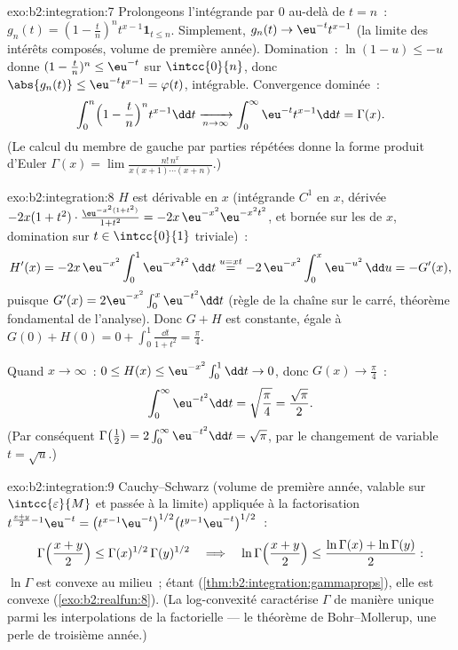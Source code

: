 \begin{solution}{exo:b2:integration:7}
Prolongeons l'intégrande par $0$ au-delà de $t = n$~: $g_n(t) = (1 -
\frac tn)^n t^{x-1}\mathbf{1}_{t \leq n}$. Simplement, $g_n(t) \to
\eu^{-t}t^{x-1}$ (la limite des intérêts composés, volume de première année).
Domination~: $\ln(1 - u) \leq -u$ donne $(1 - \frac tn)^n \leq
\eu^{-t}$ sur $\intcc{0}{n}$, donc $\abs{g_n(t)} \leq
\eu^{-t}t^{x-1} = \varphi(t)$, intégrable. Convergence dominée~:
\[
\int_0^n \Bigl(1 - \frac tn\Bigr)^n t^{x-1}\dd t
\xrightarrow[n\to\infty]{} \int_0^\infty \eu^{-t}t^{x-1}\dd t
= \Gamma(x) .
\]
(Le calcul du membre de gauche par parties répétées donne la forme
produit d'Euler $\Gamma(x) = \lim \frac{n!\,n^x}{x(x+1)\cdots(x+n)}$.)
\end{solution}

\begin{solution}{exo:b2:integration:8}
$H$ est dérivable en $x$ (intégrande $C^1$ en $x$, dérivée
$-2x(1+t^2)\cdot\frac{\eu^{-x^2(1+t^2)}}{1+t^2} =
-2x\,\eu^{-x^2}\eu^{-x^2t^2}$,  et bornée sur les 
de $x$, domination sur $t \in \intcc{0}{1}$ triviale)~:
\[
H'(x) = -2x\,\eu^{-x^2}\int_0^1 \eu^{-x^2t^2}\,\dd t
\overset{u = xt}{=} -2\,\eu^{-x^2}\int_0^x \eu^{-u^2}\,\dd u
= -G'(x),
\]
puisque $G'(x) = 2\eu^{-x^2}\int_0^x \eu^{-t^2}\dd t$ (règle de la chaîne sur
le carré, théorème fondamental de l'analyse). Donc $G + H$ est
constante, égale à $G(0) + H(0) = 0 + \int_0^1 \frac{\dd t}{1+t^2}
= \frac\pi4$.

Quand $x \to \infty$~: $0 \leq H(x) \leq \eu^{-x^2}\int_0^1 \dd t \to
0$, donc $G(x) \to \frac\pi4$~:
\[
\int_0^\infty \eu^{-t^2}\dd t = \sqrt{\frac\pi4} =
\frac{\sqrt\pi}{2} .
\]
(Par conséquent $\Gamma\bigl(\frac12\bigr) = 2\int_0^\infty
\eu^{-t^2}\dd t = \sqrt\pi$, par le changement de variable $t = \sqrt u$.)
\end{solution}

\begin{solution}{exo:b2:integration:9}
Cauchy--Schwarz (volume de première année, valable sur $\intcc{\varepsilon}{M}$
et passée à la limite) appliquée à la factorisation
$t^{\frac{x+y}{2}-1}\eu^{-t} = \bigl(t^{x-1}\eu^{-t}\bigr)^{1/2}
\bigl(t^{y-1}\eu^{-t}\bigr)^{1/2}$~:
\[
\Gamma\Bigl(\frac{x+y}{2}\Bigr) \leq
\Gamma(x)^{1/2}\,\Gamma(y)^{1/2}
\quad\Longrightarrow\quad
\ln\Gamma\Bigl(\frac{x+y}{2}\Bigr) \leq \frac{\ln\Gamma(x) +
\ln\Gamma(y)}{2} :
\]
$\ln\Gamma$ est convexe au milieu~; étant 
(\cref{thm:b2:integration:gammaprops}), elle est convexe
(\cref{exo:b2:realfun:8}). (La log-convexité caractérise $\Gamma$ de
manière unique parmi les interpolations de la factorielle --- le
théorème de Bohr--Mollerup, une perle de troisième année.)
\end{solution}

